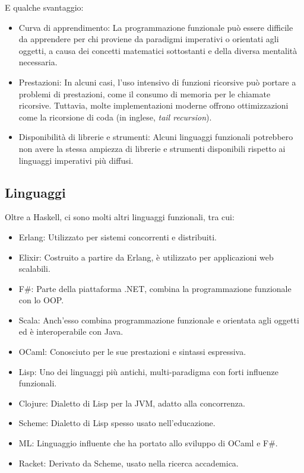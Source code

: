 \documentclass[
  letterpaper,
]{scrbook}
\begin{document}
E qualche svantaggio:

\begin{itemize}
\item
  Curva di apprendimento: La programmazione funzionale può essere
  difficile da apprendere per chi proviene da paradigmi imperativi o
  orientati agli oggetti, a causa dei concetti matematici sottostanti e
  della diversa mentalità necessaria.
\item
  Prestazioni: In alcuni casi, l'uso intensivo di funzioni ricorsive può
  portare a problemi di prestazioni, come il consumo di memoria per le
  chiamate ricorsive. Tuttavia, molte implementazioni moderne offrono
  ottimizzazioni come la ricorsione di coda (in inglese, \emph{tail
  recursion}).
\item
  Disponibilità di librerie e strumenti: Alcuni linguaggi funzionali
  potrebbero non avere la stessa ampiezza di librerie e strumenti
  disponibili rispetto ai linguaggi imperativi più diffusi.
\end{itemize}

\subsection{Linguaggi}\label{linguaggi-1}

Oltre a Haskell, ci sono molti altri linguaggi funzionali, tra cui:

\begin{itemize}
\item
  Erlang: Utilizzato per sistemi concorrenti e distribuiti.
\item
  Elixir: Costruito a partire da Erlang, è utilizzato per applicazioni
  web scalabili.
\item
  F\#: Parte della piattaforma .NET, combina la programmazione
  funzionale con lo OOP.
\item
  Scala: Anch'esso combina programmazione funzionale e orientata agli
  oggetti ed è interoperabile con Java.
\item
  OCaml: Conosciuto per le sue prestazioni e sintassi espressiva.
\item
  Lisp: Uno dei linguaggi più antichi, multi-paradigma con forti
  influenze funzionali.
\item
  Clojure: Dialetto di Lisp per la JVM, adatto alla concorrenza.
\item
  Scheme: Dialetto di Lisp spesso usato nell'educazione.
\item
  ML: Linguaggio influente che ha portato allo sviluppo di OCaml e F\#.
\item
  Racket: Derivato da Scheme, usato nella ricerca accademica.
\end{itemize}
\end{document}

